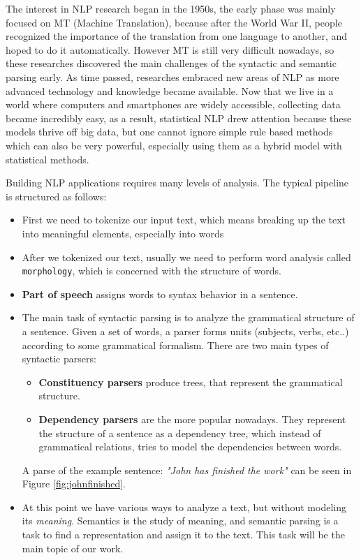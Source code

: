 The interest in NLP research began in the 1950s, the early phase was mainly focused on MT (Machine Translation), because after the World War II, people
recognized the importance of the translation from one language to another, and hoped to do it automatically.
However MT is still very difficult nowadays, so these researches discovered the main challenges of the syntactic and semantic parsing early.
As time passed, researches embraced new areas of NLP as more advanced technology and knowledge became available. Now that we live in a world where
computers and smartphones are widely accessible, collecting data became incredibly easy, as a result, statistical NLP drew attention because these models thrive off big data, but one cannot ignore 
simple rule based methods which can also be very powerful, especially using them as a hybrid model with statistical methods.

Building NLP applications requires many levels of analysis.
The typical pipeline is structured as follows:
\begin{itemize}
	\item First we need to tokenize our input text, which means breaking up the text into meaningful elements, especially into words
	\item After we tokenized our text, usually we need to perform word analysis called \texttt{morphology}, which is concerned with the structure of words.
	\item \textbf{Part of speech} assigns words to syntax behavior in a sentence.
	\item The main task of syntactic parsing is to analyze the grammatical structure of a sentence. Given a set of words, a parser forms units (subjects, verbs, etc..) according to some grammatical formalism.
	There are two main types of syntactic parsers:
	\begin{itemize}
		\item \textbf{Constituency parsers} produce trees, that represent the grammatical structure.
		\item \textbf{Dependency parsers} are the more popular nowadays. They represent the structure of a sentence as a dependency tree, which instead of grammatical relations, tries to model the dependencies between words.
	\end{itemize}
	A parse of the example sentence: \textit{"John has finished the work"} can be seen in Figure \ref{fig:johnfinished}.
	
	\item At this point we have various ways to analyze a text, but without modeling its \textit{meaning}. Semantics is the study of meaning, and semantic parsing is a task to find a representation and assign it to the text. This task will be the main topic of our work.
\end{itemize}

